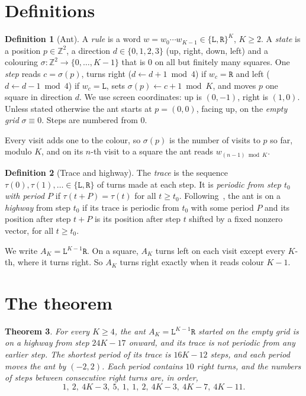 \documentclass[11pt,a4paper]{article}
\newtheorem{theorem}{Theorem}
\theoremstyle{definition}
\newtheorem{definition}[theorem]{Definition}
\theoremstyle{remark}
\newcommand{\Lw}{\mathtt{L}}
\newcommand{\Rw}{\mathtt{R}}
\newcommand{\Z}{\mathbb{Z}}
\begin{document}
\section{Definitions}\label{sec:defs}

\begin{definition}[Ant]
A \emph{rule} is a word $w = w_0 \cdots w_{K-1} \in \{\Lw,\Rw\}^K$, $K \ge 2$. A \emph{state} is a
position $p \in \Z^2$, a direction $d \in \{0,1,2,3\}$ (up, right, down, left) and a colouring
$\sigma : \Z^2 \to \{0, \dots, K-1\}$ that is $0$ on all but finitely many squares. One \emph{step} reads
$c = \sigma(p)$, turns right ($d \leftarrow d+1 \bmod 4$) if $w_c = \Rw$ and left
($d \leftarrow d - 1 \bmod 4$) if $w_c = \Lw$, sets $\sigma(p) \leftarrow c+1 \bmod K$, and moves $p$ one
square in direction $d$. We use screen coordinates: up is $(0,-1)$, right is $(1,0)$. Unless stated
otherwise the ant starts at $p = (0,0)$, facing up, on the \emph{empty grid} $\sigma \equiv 0$. Steps are
numbered from $0$.
\end{definition}

Every visit adds one to the colour, so $\sigma(p)$ is the number of visits to $p$ so far, modulo $K$, and on
its $n$-th visit to a square the ant reads $w_{(n-1) \bmod K}$.

\begin{definition}[Trace and highway]
The \emph{trace} is the sequence $\tau(0), \tau(1), \dots \in \{\Lw,\Rw\}$ of turns made at each step.
It is \emph{periodic from step $t_0$ with period $P$} if $\tau(t + P) = \tau(t)$ for all $t \ge t_0$. Following~\cite{glr},
the ant is on a \emph{highway} from step $t_0$ if its trace is periodic from $t_0$ with some period $P$ and
its position after step $t + P$ is its position after step $t$ shifted by a fixed nonzero vector, for all
$t \ge t_0$.
\end{definition}

We write $A_K = \Lw^{K-1}\Rw$. On a square, $A_K$ turns left on each visit except every $K$-th, where it turns
right. So $A_K$ turns right exactly when it reads colour $K-1$.

\section{The theorem}\label{sec:theorem}

\begin{theorem}\label{thm:main}
For every $K \ge 4$, the ant $A_K = \Lw^{K-1}\Rw$ started on the empty grid is on a highway from step
$24K - 17$ onward, and its trace is not periodic from any earlier step. The shortest period of its trace is
$16K - 12$ steps, and each period moves the ant by $(-2, 2)$. Each period contains $10$ right turns, and the
numbers of steps between consecutive right turns are, in order,
\[
1,\ 2,\ 4K-3,\ 5,\ 1,\ 1,\ 2,\ 4K-3,\ 4K-7,\ 4K-11 .
\]
\end{theorem}
\end{document}
